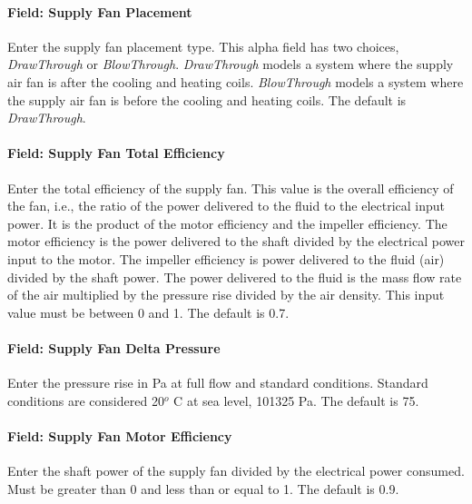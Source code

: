 \paragraph{Field: Supply Fan Placement}\label{field-supply-fan-placement-2}

Enter the supply fan placement type. This alpha field has two choices, \emph{DrawThrough} or \emph{BlowThrough}. \emph{DrawThrough} models a system where the supply air fan is after the cooling and heating coils. \emph{BlowThrough} models a system where the supply air fan is before the cooling and heating coils. The default is \emph{DrawThrough}.

\paragraph{Field: Supply Fan Total Efficiency}\label{field-supply-fan-total-efficiency-3}

Enter the total efficiency of the supply fan. This value is the overall efficiency of the fan, i.e., the ratio of the power delivered to the fluid to the electrical input power. It is the product of the motor efficiency and the impeller efficiency. The motor efficiency is the power delivered to the shaft divided by the electrical power input to the motor. The impeller efficiency is power delivered to the fluid (air) divided by the shaft power. The power delivered to the fluid is the mass flow rate of the air multiplied by the pressure rise divided by the air density. This input value must be between 0 and 1. The default is 0.7.

\paragraph{Field: Supply Fan Delta Pressure}\label{field-supply-fan-delta-pressure-2}

Enter the pressure rise in Pa at full flow and standard conditions. Standard conditions are considered 20\(^{o}\) C at sea level, 101325 Pa. The default is 75.

\paragraph{Field: Supply Fan Motor Efficiency}\label{field-supply-fan-motor-efficiency-3}

Enter the shaft power of the supply fan divided by the electrical power consumed. Must be greater than 0 and less than or equal to 1. The default is 0.9.

